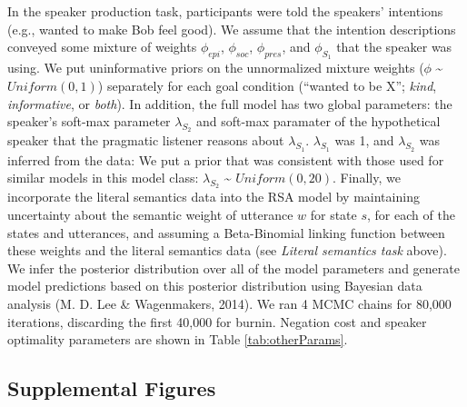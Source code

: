 \documentclass[floatsintext,man]{apa6}
\theoremstyle{definition}
\theoremstyle{definition}
\theoremstyle{definition}
\theoremstyle{remark}
\begin{document}
In the speaker production task, participants were told the speakers'
intentions (e.g., wanted to make Bob feel good). We assume that the
intention descriptions conveyed some mixture of weights \(\phi_{epi}\),
\(\phi_{soc}\), \(\phi_{pres}\), and \(\phi_{S_1}\) that the speaker was
using. We put uninformative priors on the unnormalized mixture weights
(\(\phi\) \textasciitilde{} \(Uniform(0,1)\)) separately for each goal
condition (\enquote{wanted to be X}; \emph{kind}, \emph{informative}, or
\emph{both}). In addition, the full model has two global parameters: the
speaker's soft-max parameter \(\lambda_{S_2}\) and soft-max paramater of
the hypothetical speaker that the pragmatic listener reasons about
\(\lambda_{S_1}\). \(\lambda_{S_1}\) was 1, and \(\lambda_{S_2}\) was
inferred from the data: We put a prior that was consistent with those
used for similar models in this model class: \(\lambda_{S_2}\)
\textasciitilde{} \(Uniform(0,20)\). Finally, we incorporate the literal
semantics data into the RSA model by maintaining uncertainty about the
semantic weight of utterance \(w\) for state \(s\), for each of the
states and utterances, and assuming a Beta-Binomial linking function
between these weights and the literal semantics data (see \emph{Literal
semantics task} above). We infer the posterior distribution over all of
the model parameters and generate model predictions based on this
posterior distribution using Bayesian data analysis (M. D. Lee \&
Wagenmakers, 2014). We ran 4 MCMC chains for 80,000 iterations,
discarding the first 40,000 for burnin. Negation cost and speaker
optimality parameters are shown in Table \ref{tab:otherParams}.

\newpage

\subsection{Supplemental Figures}\label{supplemental-figures}
\end{document}
